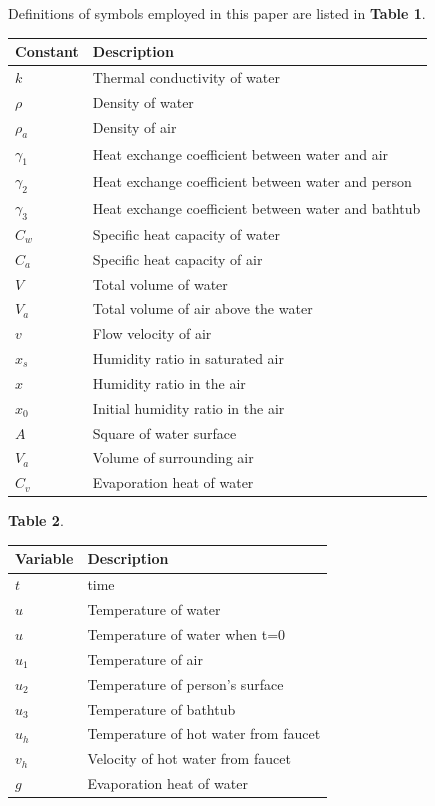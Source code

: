 \documentclass[12pt,a4paper,titlepage]{article}
\begin{document}
Definitions of symbols employed in this paper are listed in
\textbf{Table 1}.
\begin{table}
\begin{tabular}{l|l}
  Constant & Description \\
  \hline
  $k$            &Thermal conductivity of water \\
  $\rho$         &Density of water \\
  ${\rho}_a$     &Density of air \\
  ${\gamma}_1$   &Heat exchange coefficient between water and air \\
  ${\gamma}_2$   &Heat exchange coefficient between water and person \\
  ${\gamma}_3$   &Heat exchange coefficient between water and bathtub \\
  $C_w$          &Specific heat capacity of water \\
  $C_a$          &Specific heat capacity of air \\
  $V$            &Total volume of water \\
  $V_a$          &Total volume of air above the water \\
  $v$            &Flow velocity of air\\
  $x_s$          &Humidity ratio in saturated air \\
  $x$            &Humidity ratio in the air \\
  $x_0$          &Initial humidity ratio in the air \\
  $A$            &Square of water surface \\
  $V_a$          &Volume of surrounding air \\
  $C_v$          &Evaporation heat of water \\
\end{tabular}
\end{table}

\textbf{Table 2}.
\begin{table}
\begin{tabular}{l|l}
  Variable & Description \\
  \hline
  $t$            &time \\
  $u$            &Temperature of water \\
  $u$            &Temperature of water when t=0 \\
  $u_1$          &Temperature of air \\
  $u_2$          &Temperature of person's surface \\
  $u_3$          &Temperature of bathtub \\
  $u_h$          &Temperature of hot water from faucet \\
  $v_h$          &Velocity of hot water from faucet \\
  $g$            &Evaporation heat of water\\
\end{tabular}
\end{table}
\end{document}
